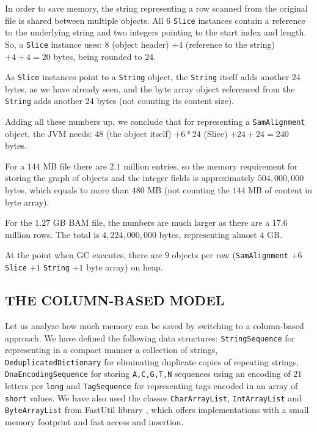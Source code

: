 \documentclass[a4paper,twoside]{article}
\begin{document}
In order to save memory, the string representing a row scanned from the original file is shared between multiple objects. All $6$ {\tt Slice} instances contain a reference to the  underlying string and two integers pointing to the start index and length. So, a {\tt Slice} instance uses: $8$ (object header) $+4$ (reference to the string) $ + 4 + 4 = 20$ bytes, being rounded to $24$.


As {\tt Slice} instances point to a {\tt String} object, the {\tt String} itself adds another $24$ bytes, as we have already seen, and the byte array object referenced from the {\tt String} adds another $24$ bytes (not counting its content size).


Adding all these numbers up, we conclude that for representing a {\tt SamAlignment} object, the JVM needs: $48$ (the object itself) $+ 6*24$ (Slice) $ + 24 + 24 = 240$ bytes.

For a $144$ MB file there are $2.1$ million entries, so the memory requirement for storing the graph of objects and the integer fields is approximately $504,000,000$ bytes, which equals to more than $480$ MB (not counting the $144$ MB of content in byte array).

For the $1.27$ GB BAM file, the numbers are much larger as there are a $17.6$ million rows. The total is $4,224,000,000$ bytes, representing almost $4$ GB.


At the point when GC executes, there are $9$ objects per row 
({\tt SamAlignment} $+ 6$ {\tt Slice} $+ 1$ {\tt String} $+ 1$ byte array) on heap.


\subsection{\uppercase{The Column-Based Model}}

Let us analyze how much memory can be saved by switching to a column-based approach.
We have defined the following data structures: {\tt StringSequence} for representing in a compact manner a collection of strings, {\tt DeduplicatedDictionary} for eliminating duplicate copies of repeating strings, {\tt DnaEncodingSequence} for storing {\tt A,C,G,T,N} sequences using an encoding of $21$ letters per {\tt long} and {\tt TagSequence} for representing tags encoded in an array of {\tt short} values.
We have also used the classes {\tt CharArrayList}, {\tt IntArrayList} and {\tt ByteArrayList} from FastUtil library \cite{fastutil}, which offers implementations with a small memory footprint and fast access and insertion.
\end{document}
